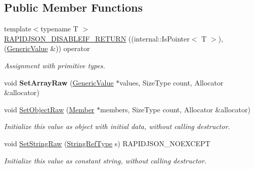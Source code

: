 \subsection*{Public Member Functions}
\begin{DoxyCompactItemize}
\item 
{\footnotesize template$<$typename T $>$ }\\\hyperlink{classGenericValue_a4a4418a93777942e1fb7ea71f8aaf680}{R\+A\+P\+I\+D\+J\+S\+O\+N\+\_\+\+D\+I\+S\+A\+B\+L\+E\+I\+F\+\_\+\+R\+E\+T\+U\+RN} ((internal\+::\+Is\+Pointer$<$ T $>$),(\hyperlink{classGenericValue}{Generic\+Value} \&)) operator
\begin{DoxyCompactList}\small\item\em Assignment with primitive types. \end{DoxyCompactList}\item 
\mbox{\label{classGenericValue_a8f5f309065479de40a16cf28a340da65}} 
void {\bfseries Set\+Array\+Raw} (\hyperlink{classGenericValue}{Generic\+Value} $\ast$values, Size\+Type count, Allocator \&allocator)
\item 
\mbox{\label{classGenericValue_a26c8ec7d68858df1038506df7fcff22d}} 
void \hyperlink{classGenericValue_a26c8ec7d68858df1038506df7fcff22d}{Set\+Object\+Raw} (\hyperlink{classGenericValue_a7ccf27c44058b4c11c3efc6473afb886}{Member} $\ast$members, Size\+Type count, Allocator \&allocator)
\begin{DoxyCompactList}\small\item\em Initialize this value as object with initial data, without calling destructor. \end{DoxyCompactList}\item 
\mbox{\label{classGenericValue_a1451603922dcdf34976f125dc60f70ee}} 
void \hyperlink{classGenericValue_a1451603922dcdf34976f125dc60f70ee}{Set\+String\+Raw} (\hyperlink{classGenericValue_a32e0f30ee278072374c8168b14d3317f}{String\+Ref\+Type} s) R\+A\+P\+I\+D\+J\+S\+O\+N\+\_\+\+N\+O\+E\+X\+C\+E\+PT
\begin{DoxyCompactList}\small\item\em Initialize this value as constant string, without calling destructor. \end{DoxyCompactList}\item 
\mbox{\label{classGenericValue_ad3d91db36dfdbfc1af40a79aae07723c}} 

\end{DoxyCompactItemize}
